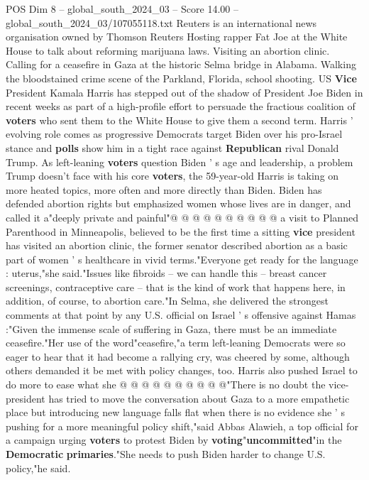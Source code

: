 \begin{textsample}{POS Dim 8 – global\_south\_2024\_03 – Score 14.00 – global\_south\_2024\_03/107055118.txt}  \label{ex:f8_pos_091}
Reuters is an international news organisation owned by Thomson Reuters Hosting rapper Fat Joe at the White House to talk about reforming marijuana laws.
Visiting an abortion clinic.
Calling for a ceasefire in Gaza at the historic Selma bridge in Alabama.
Walking the bloodstained crime scene of the Parkland, Florida, school shooting.
US \textbf{Vice} President Kamala Harris has stepped out of the shadow of President Joe Biden in recent weeks as part of a high-profile effort to persuade the fractious coalition of \textbf{voters} who sent them to the White House to give them a second term.
Harris ' evolving role comes as progressive Democrats target Biden over his pro-Israel stance and \textbf{polls} show him in a tight race against \textbf{Republican} rival Donald Trump.
As left-leaning \textbf{voters} question Biden ' s age and leadership, a problem Trump doesn't face with his core \textbf{voters}, the 59-year-old Harris is taking on more heated topics, more often and more directly than Biden.
Biden has defended abortion rights but emphasized women whose lives are in danger, and called it a"deeply private and painful"@ @ @ @ @ @ @ @ @ @ a visit to Planned Parenthood in Minneapolis, believed to be the first time a sitting \textbf{vice} president has visited an abortion clinic, the former senator described abortion as a basic part of women ' s healthcare in vivid terms."Everyone get ready for the language : uterus,"she said."Issues like fibroids -- we can handle this -- breast cancer screenings, contraceptive care -- that is the kind of work that happens here, in addition, of course, to abortion care."In Selma, she delivered the strongest comments at that point by any U.S. official on Israel ' s offensive against Hamas :"Given the immense scale of suffering in Gaza, there must be an immediate ceasefire."Her use of the word"ceasefire,"a term left-leaning Democrats were so eager to hear that it had become a rallying cry, was cheered by some, although others demanded it be met with policy changes, too.
Harris also pushed Israel to do more to ease what she @ @ @ @ @ @ @ @ @ @"There is no doubt the vice-president has tried to move the conversation about Gaza to a more empathetic place but introducing new language falls flat when there is no evidence she ' s pushing for a more meaningful policy shift,"said Abbas Alawieh, a top official for a campaign urging \textbf{voters} to protest Biden by \textbf{voting}"\textbf{uncommitted}"in the \textbf{Democratic} \textbf{primaries}."She needs to push Biden harder to change U.S. policy,"he said.

\end{textsample}
